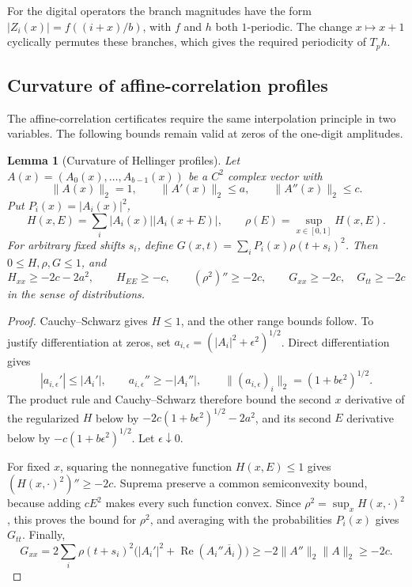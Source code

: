 \documentclass[11pt,a4paper]{article}
\theoremstyle{paperplain}
\newtheorem{lemma}[theorem]{Lemma}
\numberwithin{equation}{section}
\begin{document}
For the digital operators the branch magnitudes have the form
$|Z_i(x)|=f((i+x)/b)$, with $f$ and $h$ both $1$-periodic.
The change $x\mapsto x+1$ cyclically permutes these branches,
which gives the required periodicity of $T_ph$.

\subsection{Curvature of affine-correlation profiles}

The affine-correlation certificates require the same interpolation principle
in two variables. The following bounds remain valid at zeros of the
one-digit amplitudes.

\begin{lemma}[Curvature of Hellinger profiles]\label{prelim:hellinger-curvature}
Let $A(x)=(A_0(x),\ldots,A_{b-1}(x))$ be a $C^2$ complex vector with
\[
 \|A(x)\|_2=1,\qquad \|A'(x)\|_2\leqslant a,\qquad
 \|A''(x)\|_2\leqslant c.
\]
Put $P_i(x)=|A_i(x)|^2$,
\[
 H(x,E)=\sum_i|A_i(x)||A_i(x+E)|,\qquad
 \rho(E)=\sup_{x\in[0,1]}H(x,E).
\]
For arbitrary fixed shifts $s_i$, define
$G(x,t)=\sum_iP_i(x)\rho(t+s_i)^2$. Then
$0\leqslant H,\rho,G\leqslant1$, and
\[
 H_{xx}\geqslant-2c-2a^2,\qquad H_{EE}\geqslant-c,\qquad
 (\rho^2)''\geqslant-2c,\qquad
 G_{xx}\geqslant-2c,\quad G_{tt}\geqslant-2c
\]
in the sense of distributions.
\end{lemma}
\begin{proof}
Cauchy--Schwarz gives $H\leqslant1$, and the other range bounds follow.
To justify differentiation at zeros, set
$a_{i,\epsilon}=(|A_i|^2+\epsilon^2)^{1/2}$. Direct differentiation gives
\[
 |a_{i,\epsilon}'|\leqslant|A_i'|,
 \qquad a_{i,\epsilon}''\geqslant-|A_i''|,
 \qquad \|(a_{i,\epsilon})_i\|_2=(1+b\epsilon^2)^{1/2}.
\]
The product rule and Cauchy--Schwarz therefore bound the second
$x$ derivative of the regularized $H$ below by
$-2c(1+b\epsilon^2)^{1/2}-2a^2$, and its second $E$ derivative below by
$-c(1+b\epsilon^2)^{1/2}$. Let $\epsilon\downarrow0$.

For fixed $x$, squaring the nonnegative function $H(x,E)\leqslant1$
gives $(H(x,\cdot)^2)''\geqslant-2c$. Suprema preserve a common
semiconvexity bound, because adding $cE^2$ makes every such function
convex. Since $\rho^2=\sup_x H(x,\cdot)^2$, this proves the bound for
$\rho^2$, and averaging with the probabilities $P_i(x)$ gives $G_{tt}$.
Finally,
\[
 G_{xx}
 =2\sum_i\rho(t+s_i)^2
       \bigl(|A_i'|^2+\operatorname{Re}(A_i''\overline{A_i})\bigr)
 \geqslant-2\|A''\|_2\|A\|_2\geqslant-2c.
\]
\end{proof}
\end{document}
